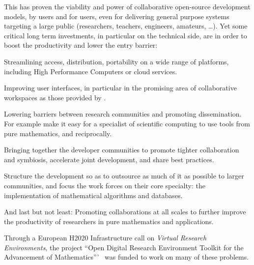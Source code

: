 This has proven the viability and power of collaborative open-source development models,
by users and for users, even for delivering general purpose systems targeting a large
public (researchers, teachers, engineers, amateurs, \ldots). Yet some critical long term
investments, in particular on the technical side, are in order to boost the productivity
and lower the entry barrier:
\begin{compactitem}
\item Streamlining access, distribution, portability on a wide range of platforms, including
  High Performance Computers or cloud services.
\item Improving user interfaces, in particular in the promising area of collaborative
  workspaces as those provided by \SMC.
\item Lowering barriers between research communities and promoting dissemination. For example
  make it easy for a specialist of scientific computing to use tools from pure
  mathematics, and reciprocally.
\item Bringing together the developer communities to promote tighter collaboration and
  symbiosis, accelerate joint development, and share best practices.
\item Structure the development so as to outsource as much of it as possible to larger communities, and focus
  the work forces on their core specialty: the implementation of mathematical algorithms
  and databases.
\item And last but not least: Promoting collaborations at all scales to further improve
  the productivity of researchers in pure mathematics and applications.
\end{compactitem}

Through a European H2020 Infrastructure call \cite{EINFRA-9} on \emph{Virtual Research Environments}, the project ``Open Digital Research Environment Toolkit for the Advancement of Mathematics'''~\cite{OpenDreamKit:on} was funded to work on many of these problems. 

